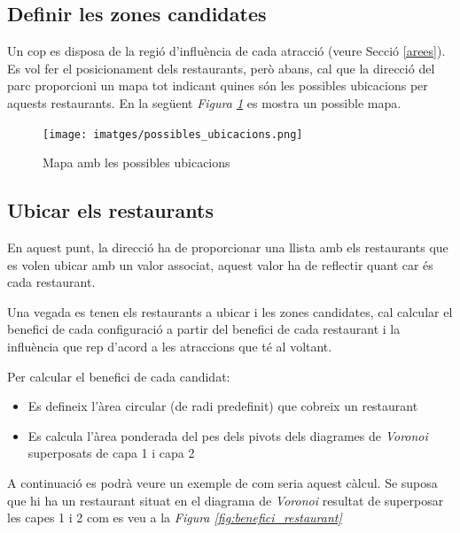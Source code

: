 \documentclass[12pt]{article}
\begin{document}

\subsection{Definir les zones candidates}
Un cop es disposa de la regió d'influència de cada atracció (veure Secció \ref{arees}). Es vol fer el posicionament dels restaurants, però abans, cal que la direcció del parc proporcioni un mapa tot indicant quines són les possibles ubicacions per aquests restaurants. En la següent \textit{Figura \ref{fig:zones_candidates}} es mostra un possible mapa.

\begin{figure}[H]
	\centering
	\texttt{[image: imatges/possibles\_ubicacions.png]}
	\caption{Mapa amb les possibles ubicacions}
	\label{fig:zones_candidates}
\end{figure}

\subsection{Ubicar els restaurants}
En aquest punt, la direcció ha de proporcionar una llista amb els restaurants que es volen ubicar amb un valor associat, aquest valor ha de reflectir quant car és cada restaurant.

Una vegada es tenen els restaurants a ubicar i les zones candidates, cal calcular el benefici de cada configuració a partir del benefici de cada restaurant i la influència que rep d'acord a les atraccions que té al voltant.  

Per calcular el benefici de cada candidat:
\begin{itemize}
	\item Es defineix l'àrea circular (de radi predefinit) que cobreix un restaurant
	\item Es calcula l'àrea ponderada del pes dels pivots dels diagrames de \textit{Voronoi} superposats de capa 1 i capa 2
\end{itemize}

A continuació es podrà veure un exemple de com seria aquest càlcul. Se suposa que hi ha un restaurant situat en el diagrama de \textit{Voronoi} resultat de superposar les capes 1 i 2 com es veu a la \textit{Figura \ref{fig:benefici_restaurant}}
\end{document}
